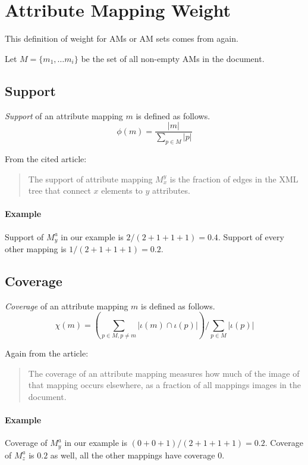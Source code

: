 \section{Attribute Mapping Weight}
\label{section-definitions-weight}

This definition of weight for AMs or AM sets comes from \cite{fidax} again.

Let $M = \{m_1, \dots m_i\}$ be the set of all non-empty AMs in the document.

\subsection{Support}

\begin{define}[Support]
\textit{Support} of an attribute mapping $m$ is defined as follows.
\[\phi(m) = \frac{|m|}{\sum_{p \in M}|p|}\]
\end{define}

From the cited article:
\begin{quote}
The support of attribute mapping $M_x^y$ is the fraction of edges in the XML tree that connect $x$ elements to $y$ attributes.
\end{quote}

\paragraph{Example}
Support of $M_{y}^{a}$ in our example is $2 / (2+1+1+1) = 0.4$. Support of every other mapping is $1 / (2+1+1+1) = 0.2$.

\subsection{Coverage}

\begin{define}[Coverage]
\textit{Coverage} of an attribute mapping $m$ is defined as follows.
\[\chi(m) = \left( \sum_{p \in M, p \neq m} |\iota(m) \cap \iota(p)| \right) / \sum_{p \in M} |\iota(p)|\]
\end{define}

Again from the article:
\begin{quote}
The coverage of an attribute mapping measures how much of the image of that mapping occurs elsewhere, as a fraction of all mappings images in the document.
\end{quote}

\paragraph{Example}
Coverage of $M_{y}^{a}$ in our example is $(0+0+1) / (2+1+1+1) = 0.2$. Coverage of $M_{z}^{a}$ is $0.2$ as well, all the other mappings have coverage $0$.
\\

